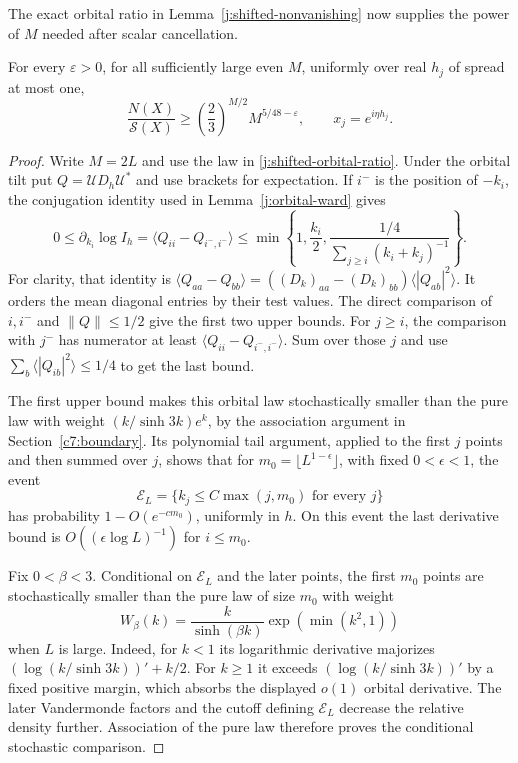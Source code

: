The exact orbital ratio in Lemma~\ref{j:shifted-nonvanishing}
now supplies the power of $M$ needed after scalar cancellation.

\begin{lemma}\label{j:shifted-normalizer-bound}
For every $\varepsilon>0$, for all sufficiently large even $M$,
uniformly over real $h_j$ of spread at most one,
\begin{equation}\label{c7:eq-P}
 \frac{N(X)}{\mathcal S(X)}
 \ge \left(\frac23\right)^{M/2}M^{5/48-\varepsilon},
 \qquad x_j=e^{i\eta h_j}.
\end{equation}
\end{lemma}

\begin{proof}
Write $M=2L$ and use the law in
\eqref{j:shifted-orbital-ratio}. Under the orbital tilt put
$Q=\mathcal U D_h\mathcal U^*$ and use brackets for expectation.
If $i^-$ is the position of $-k_i$, the conjugation identity
used in Lemma~\ref{j:orbital-ward} gives
\[
 0\le\partial_{k_i}\log I_h
 =\langle Q_{ii}-Q_{i^-,i^-}\rangle
 \le\min\left\{1,\frac{k_i}{2},
 \frac{1/4}{\sum_{j\ge i}(k_i+k_j)^{-1}}\right\}.
\]
For clarity, that identity is
$\langle Q_{aa}-Q_{bb}\rangle
=((D_k)_{aa}-(D_k)_{bb})\langle|Q_{ab}|^2\rangle$.
It orders the mean diagonal entries by their test values.
The direct comparison of $i,i^-$ and $\|Q\|\le1/2$ give the
first two upper bounds. For $j\ge i$, the comparison with $j^-$
has numerator at least
$\langle Q_{ii}-Q_{i^-,i^-}\rangle$. Sum over those $j$ and
use $\sum_b\langle|Q_{ib}|^2\rangle\le1/4$ to get the last bound.

The first upper bound makes this orbital law stochastically
smaller than the pure law with weight $(k/\sinh3k)e^k$, by the
association argument in Section~\ref{c7:boundary}. Its
polynomial tail argument, applied to the first $j$ points and
then summed over $j$, shows that for
$m_0=\lfloor L^{1-\epsilon}\rfloor$, with fixed
$0<\epsilon<1$, the event
\[
 \mathcal E_L=\{k_j\le C\max(j,m_0)\text{ for every }j\}
\]
has probability $1-O(e^{-c m_0})$, uniformly in $h$. On this
event the last derivative bound is $O((\epsilon\log L)^{-1})$
for $i\le m_0$.

Fix $0<\beta<3$. Conditional on $\mathcal E_L$ and the later
points, the first $m_0$ points are stochastically smaller than
the pure law of size $m_0$ with weight
\[
 W_\beta(k)=\frac{k}{\sinh(\beta k)}\exp(\min(k^2,1))
\]
when $L$ is large. Indeed, for $k<1$ its logarithmic derivative
majorizes $(\log(k/\sinh3k))'+k/2$. For $k\ge1$ it exceeds
$(\log(k/\sinh3k))'$ by a fixed positive margin, which absorbs
the displayed $o(1)$ orbital derivative. The later
Vandermonde factors and the cutoff defining $\mathcal E_L$
decrease the relative density further. Association of the pure
law therefore proves the conditional stochastic comparison.


\end{proof}
